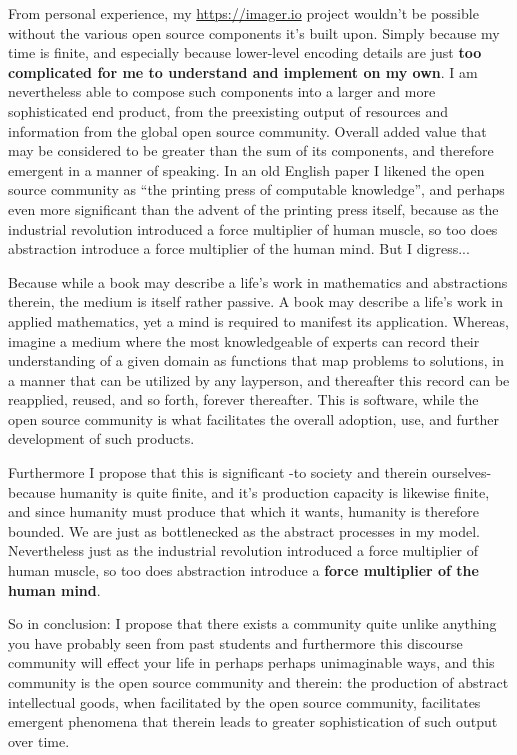 From personal experience, my \url{https://imager.io} project wouldn’t be possible without the various open source components it’s built upon. Simply because my time is finite, and especially because lower-level encoding details are just \textbf{too complicated for me to understand and implement on my own}. I am nevertheless able to compose such components into a larger and more sophisticated end product, from the preexisting output of resources and information from the global open source community. Overall added value that may be considered to be greater than the sum of its components, and therefore emergent in a manner of speaking. In an old English paper I likened the open source community as ``the printing press of computable knowledge'', and perhaps even more significant than the advent of the printing press itself, because as the industrial revolution introduced a force multiplier of human muscle, so too does abstraction introduce a force multiplier of the human mind. But I digress...  


Because while a book may describe a life’s work in mathematics and abstractions therein, the medium is itself rather passive. A book may describe a life’s work in applied mathematics, yet a mind is required to manifest its application. Whereas, imagine a medium where the most knowledgeable of experts can record their understanding of a given domain as functions that map problems to solutions, in a manner that can be utilized by any layperson, and thereafter this record can be reapplied, reused, and so forth, forever thereafter. This is software, while the open source community is what facilitates the overall adoption, use, and further development of such products. 

Furthermore I propose that this is significant -to society and therein ourselves- because humanity is quite finite, and it’s production capacity is likewise finite, and since humanity must produce that which it wants, humanity is therefore bounded. We are just as bottlenecked as the abstract processes in my model. Nevertheless just as the industrial revolution introduced a force multiplier of human muscle, so too does abstraction introduce a \textbf{force multiplier of the human mind}.

So in conclusion: I propose that there exists a community quite unlike anything you have probably seen from past students and furthermore this discourse community will effect your life in perhaps perhaps unimaginable ways, and this community is the open source community and therein: the production of abstract intellectual goods, when facilitated by the open source community, facilitates emergent phenomena that therein leads to greater sophistication of such output over time. 


